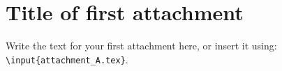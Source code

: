 \documentclass[12pt,a4paper,oneside,czech,american]{book} %
\begin{document}
\newpage 									%
\appendix 								 	%



\chapter{Title of first attachment}
Write the text for your first attachment here, or insert it using: \texttt{\textbackslash input\{attachment\_A.tex\}}.
\end{document}
